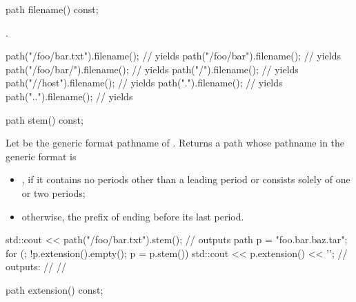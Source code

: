 %
\begin{itemdecl}
path filename() const;
\end{itemdecl}

\begin{itemdescr}
\pnum
\returns
{}.

\pnum
\begin{example}
\begin{codeblock}
path("/foo/bar.txt").filename();        // yields 
path("/foo/bar").filename();            // yields 
path("/foo/bar/").filename();           // yields 
path("/").filename();                   // yields 
path("//host").filename();              // yields 
path(".").filename();                   // yields 
path("..").filename();                  // yields 
\end{codeblock}
\end{example}
\end{itemdescr}

%
\begin{itemdecl}
path stem() const;
\end{itemdecl}

\begin{itemdescr}
\pnum
\returns
Let  be the generic format pathname of .
Returns a path whose pathname in the generic format is
\begin{itemize}
\item {}, if it contains no periods other than a leading period
or consists solely of one or two periods;
\item otherwise, the prefix of  ending before its last period.
\end{itemize}

\pnum
\begin{example}
\begin{codeblock}
std::cout << path("/foo/bar.txt").stem();       // outputs 
path p = "foo.bar.baz.tar";
for (; !p.extension().empty(); p = p.stem())
  std::cout << p.extension() << '\n';
  // outputs: 
  //          
  //          
\end{codeblock}
\end{example}
\end{itemdescr}

%
\begin{itemdecl}
path extension() const;
\end{itemdecl}

